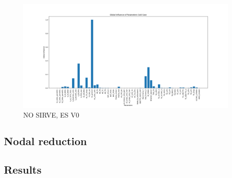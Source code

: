 \begin{figure}[H]
	\centering
	\includegraphics[width=\textwidth]{Figures/figs_malas/infGlobalCold.png}
	\caption{NO SIRVE, ES V0}
	\label{fig:fm2}
\end{figure}
\subsection{Nodal reduction}
\subsection{Results}









